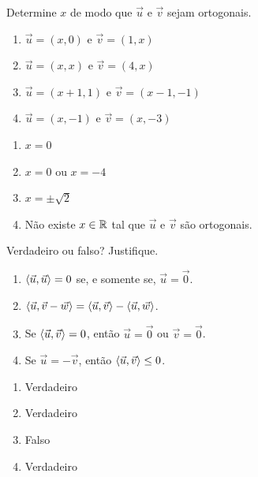 \documentclass[12pt]{exam}
\begin{document}
\vspace{.3cm}

\questao{} Determine $x$ de modo que $\vec{u}$ e $\vec{v}$ sejam ortogonais.
\begin{enumerate}[label=({\alph*})]
    \item $\vec{u} = (x, 0)$ e $\vec{v} = (1, x)$
    \item $\vec{u} = (x, x)$ e $\vec{v} = (4, x)$
    \item $\vec{u} = (x + 1, 1)$ e $\vec{v} = (x - 1, -1)$
    \item $\vec{u} = (x, -1)$ e $\vec{v} = (x, -3)$
\end{enumerate}
\begin{solucao}
    \begin{enumerate}[label=({\alph*})]
        \item $x = 0$
        \item $x = 0$ ou $x = -4$
        \item $x = \pm\sqrt{2}$
        \item Não existe $x \in \mathbb{R}$ tal que $\vec{u}$ e $\vec{v}$ são ortogonais.
    \end{enumerate}
\end{solucao}

\vspace{.3cm}

\questao{} Verdadeiro ou falso? Justifique.
\begin{enumerate}[label=({\alph*})]
    \item $\langle \vec{u}, \vec{u} \rangle = 0$ se, e somente se, $\vec{u} = \vec{0}$.
    \item $\langle\vec{u}, \vec{v} - \vec{w}\rangle = \langle \vec{u}, \vec{v} \rangle - \langle \vec{u}, \vec{w} \rangle$.
    \item Se $\langle \vec{u}, \vec{v} \rangle = 0$, então $\vec{u} = \vec{0}$ ou $\vec{v} = \vec{0}$.
    \item Se $\vec{u} = -\vec{v}$, então $\langle \vec{u}, \vec{v} \rangle \le 0$.
\end{enumerate}
\begin{solucao}
    \begin{enumerate}[label=({\alph*})]
        \item Verdadeiro
        \item Verdadeiro
        \item Falso
        \item Verdadeiro
    \end{enumerate}
\end{solucao}

\vspace{.3cm}
\end{document}
